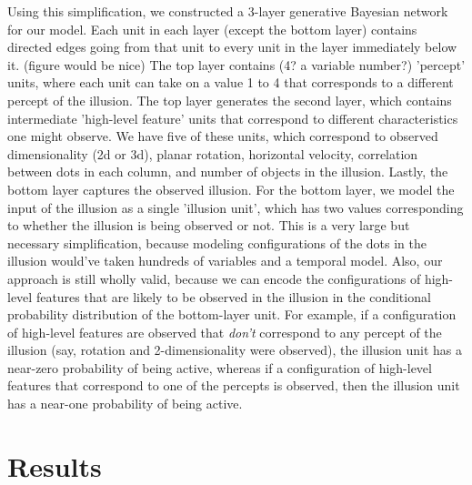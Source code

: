 \documentclass{article} %
\begin{document}
Using this simplification, we constructed a 3-layer generative Bayesian network for our model. Each unit in each layer (except the bottom layer) contains directed edges going from that unit to every unit in the layer immediately below it. (figure would be nice) The top layer contains (4? a variable number?) 'percept' units, where each unit can take on a value 1 to 4 that corresponds to a different percept of the illusion. The top layer generates the second layer, which contains intermediate 'high-level feature' units that correspond to different characteristics one might observe. We have five of these units, which correspond to observed dimensionality (2d or 3d), planar rotation, horizontal velocity, correlation between dots in each column, and number of objects in the illusion. Lastly, the bottom layer captures the observed illusion. For the bottom layer, we model the input of the illusion as a single 'illusion unit', which has two values corresponding to whether the illusion is being observed or not. This is a very large but necessary simplification, because modeling configurations of the dots in the illusion would've taken hundreds of variables and a temporal model. Also, our approach is still wholly valid, because we can encode the configurations of high-level features that are likely to be observed in the illusion in the conditional probability distribution of the bottom-layer unit. For example, if a configuration of high-level features are observed that \emph{don't} correspond to any percept of the illusion (say, rotation and 2-dimensionality were observed), the illusion unit has a near-zero probability of being active, whereas if a configuration of high-level features that correspond to one of the percepts is observed, then the illusion unit has a near-one probability of being active.





\section{Results}
\end{document}
